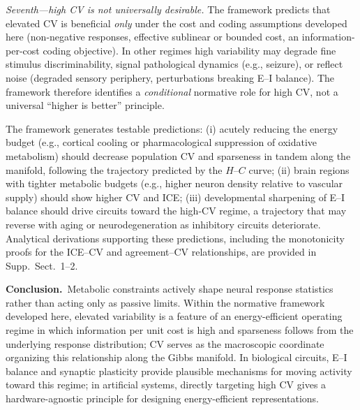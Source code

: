 \emph{Seventh---high CV is not universally desirable.}  The framework predicts that elevated CV is beneficial \emph{only} under the cost and coding assumptions developed here (non-negative responses, effective sublinear or bounded cost, an information-per-cost coding objective).  In other regimes high variability may degrade fine stimulus discriminability, signal pathological dynamics (e.g., seizure), or reflect noise (degraded sensory periphery, perturbations breaking E--I balance).  The framework therefore identifies a \emph{conditional} normative role for high CV, not a universal ``higher is better'' principle.

The framework generates testable predictions: (i) acutely reducing the energy budget (e.g., cortical cooling or pharmacological suppression of oxidative metabolism) should decrease population CV and sparseness in tandem along the manifold, following the trajectory predicted by the $H$--$C$ curve; (ii) brain regions with tighter metabolic budgets (e.g., higher neuron density relative to vascular supply) should show higher CV and ICE; (iii) developmental sharpening of E--I balance should drive circuits toward the high-CV regime, a trajectory that may reverse with aging or neurodegeneration as inhibitory circuits deteriorate.  Analytical derivations supporting these predictions, including the monotonicity proofs for the ICE--CV and agreement--CV relationships, are provided in Supp.~Sect.~1--2.

\textbf{Conclusion.}~Metabolic constraints actively shape neural response statistics rather than acting only as passive limits.  Within the normative framework developed here, elevated variability is a feature of an energy-efficient operating regime in which information per unit cost is high and sparseness follows from the underlying response distribution; CV serves as the macroscopic coordinate organizing this relationship along the Gibbs manifold.  In biological circuits, E--I balance and synaptic plasticity provide plausible mechanisms for moving activity toward this regime; in artificial systems, directly targeting high CV gives a hardware-agnostic principle for designing energy-efficient representations.
